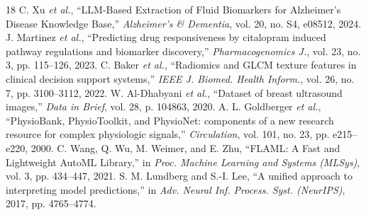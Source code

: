 \documentclass[conference]{IEEEtran}
\begin{document}
\begin{thebibliography}{18}
 C. Xu \textit{et al.}, ``LLM-Based Extraction of Fluid Biomarkers for Alzheimer's Disease Knowledge Base,'' \textit{Alzheimer's \& Dementia}, vol. 20, no. S4, e08512, 2024.
 J. Martinez \textit{et al.}, ``Predicting drug responsiveness by citalopram induced pathway regulations and biomarker discovery,'' \textit{Pharmacogenomics J.}, vol. 23, no. 3, pp. 115--126, 2023.
 C. Baker \textit{et al.}, ``Radiomics and GLCM texture features in clinical decision support systems,'' \textit{IEEE J. Biomed. Health Inform.}, vol. 26, no. 7, pp. 3100--3112, 2022.
 W. Al-Dhabyani \textit{et al.}, ``Dataset of breast ultrasound images,'' \textit{Data in Brief}, vol. 28, p. 104863, 2020.
 A. L. Goldberger \textit{et al.}, ``PhysioBank, PhysioToolkit, and PhysioNet: components of a new research resource for complex physiologic signals,'' \textit{Circulation}, vol. 101, no. 23, pp. e215--e220, 2000.
 C. Wang, Q. Wu, M. Weimer, and E. Zhu, ``FLAML: A Fast and Lightweight AutoML Library,'' in \textit{Proc. Machine Learning and Systems (MLSys)}, vol. 3, pp. 434--447, 2021.
 S. M. Lundberg and S.-I. Lee, ``A unified approach to interpreting model predictions,'' in \textit{Adv. Neural Inf. Process. Syst. (NeurIPS)}, 2017, pp. 4765--4774.
\end{thebibliography}
\end{document}
